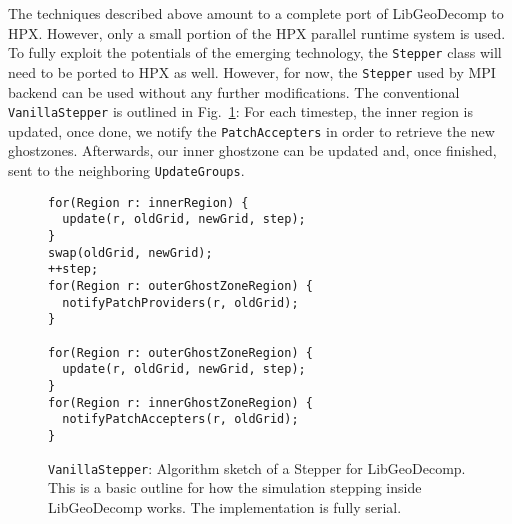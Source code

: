 \documentclass{sig-alternate}
\newcommand{\ctype}[1]{\texttt{{{#1}}}}
\newcommand{\upp}{\vspace*{-0.5em}}
\newcommand{\up}{\vspace*{-0.25em}}
\begin{document}
The techniques described above amount to a complete port of LibGeoDecomp to
HPX. However, only a small portion of the HPX parallel runtime system is used.
To fully exploit the potentials of the emerging technology, the \ctype{Stepper}
class will need to be ported to HPX as well. However, for now, the \ctype{Stepper} used by
MPI backend can be used without any further modifications. The
conventional \ctype{VanillaStepper} is outlined in Fig.~\ref{alg:vanilla_stepper}:
For each timestep, the inner region is updated, once done, we notify the
\ctype{PatchAccepters} in order to retrieve the new ghostzones. Afterwards, our
inner ghostzone can be updated and, once finished, sent to the neighboring
\ctype{UpdateGroups}.

\begin{figure}
    \begin{lstlisting}
for(Region r: innerRegion) {
  update(r, oldGrid, newGrid, step);
}
swap(oldGrid, newGrid);
++step;
for(Region r: outerGhostZoneRegion) {
  notifyPatchProviders(r, oldGrid);
}

for(Region r: outerGhostZoneRegion) {
  update(r, oldGrid, newGrid, step);
}
for(Region r: innerGhostZoneRegion) {
  notifyPatchAccepters(r, oldGrid);
}
    \end{lstlisting}
    \upp\upp
    \caption{\ctype{VanillaStepper}: Algorithm sketch of a Stepper for
    LibGeoDecomp. This is a basic outline for how the simulation stepping inside
    LibGeoDecomp works. The implementation is fully serial.}
    \label{alg:vanilla_stepper}
    \upp
    \upp
    \upp
    \up
\end{figure}
\end{document}
